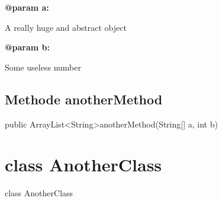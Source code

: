 \documentclass[12pt]{scrreprt}
\begin{document}
\textbf{@param a:}

\quad\quad A really huge and abstract object

\textbf{@param b:}

\quad\quad Some useless number



\section{Methode anotherMethod}
\label{examples.SimpleExample:anotherMethod}




public ArrayList\textless String\textgreater  anotherMethod(String[] a, int b)








\chapter{class AnotherClass}
\label{examples.AnotherClass}




 class AnotherClass
\end{document}
